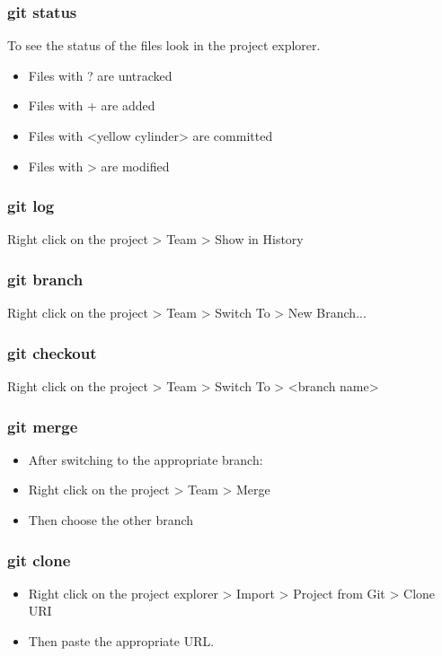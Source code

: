 \documentclass{beamer}
\begin{document}
\begin{frame}
\frametitle{git status}

To see the status of the files look in the project explorer.
\begin{itemize}
\item Files with ? are untracked
\item Files with + are added
\item Files with <yellow cylinder> are committed
\item Files with > are modified
\end{itemize}

\end{frame}

\begin{frame}
\frametitle{git log}

Right click on the project > Team > Show in History

\end{frame}


\begin{frame}
\frametitle{git branch}

Right click on the project > Team > Switch To > New Branch...

\end{frame}

\begin{frame}
\frametitle{git checkout}

Right click on the project > Team > Switch To > <branch name>

\end{frame}

\begin{frame}
\frametitle{git merge}


\begin{itemize}
\item After switching to the appropriate branch:

\item Right click on the project > Team > Merge 

\item Then choose the other branch

\end{itemize}

\end{frame}


\begin{frame}
\frametitle{git clone}


\begin{itemize}
\item Right click on the project explorer > Import > Project from Git >
Clone URI 

\item Then paste the appropriate URL.

\end{itemize}

\end{frame}
\end{document}
